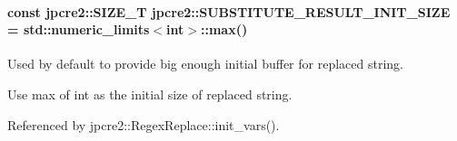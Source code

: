 \paragraph[{\texorpdfstring{S\+U\+B\+S\+T\+I\+T\+U\+T\+E\+\_\+\+R\+E\+S\+U\+L\+T\+\_\+\+I\+N\+I\+T\+\_\+\+S\+I\+ZE}{SUBSTITUTE_RESULT_INIT_SIZE}}]{\setlength{\rightskip}{0pt plus 5cm}const {\bf jpcre2\+::\+S\+I\+Z\+E\+\_\+T} jpcre2\+::\+S\+U\+B\+S\+T\+I\+T\+U\+T\+E\+\_\+\+R\+E\+S\+U\+L\+T\+\_\+\+I\+N\+I\+T\+\_\+\+S\+I\+ZE = std\+::numeric\+\_\+limits$<$int$>$\+::max()}\hypertarget{namespacejpcre2_a80cb201f2e733137b22a8ed98465096a}{}\label{namespacejpcre2_a80cb201f2e733137b22a8ed98465096a}


Used by default to provide big enough initial buffer for replaced string. 

Use max of int as the initial size of replaced string. 

Referenced by jpcre2\+::\+Regex\+Replace\+::init\+\_\+vars().

